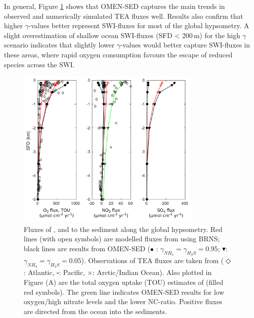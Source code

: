\documentclass[gmd, manuscript]{copernicus}
\begin{document}
In general, Figure \ref{fig:hypsometry} shows that OMEN-SED captures the main trends in observed and numerically simulated TEA fluxes well. Results also confirm that higher $\gamma$-values better represent SWI-fluxes for most of the global hypsometry. 
A slight overestimation of shallow ocean SWI-fluxes (SFD < 200\,m) for the high $\gamma$ scenario indicates that slightly lower $\gamma$-values would better capture SWI-fluxes in these areas, where rapid oxygen consumption favours the 
escape of reduced species across the SWI.

\begin{figure}[tbp]
\begin{center}
	\includegraphics[width=0.8\textwidth]{figures/0_OMEN_Thullner_hypsometry_fluxes_diff_NCratio.pdf}
	\caption{Fluxes of ,  and  to the sediment along the global hypsometry. 
	Red lines (with open symbols) are modelled fluxes from \citet{thullner_global_scale_2009} using BRNS; black lines are results from OMEN-SED ($\bullet$ : $\gamma_{NH_4}=\gamma_{H_2S}=0.95$; 
	$\blacktriangledown$: $\gamma_{NH_4}=\gamma_{H_2S}=0.05$). 
	Observations of TEA fluxes are taken from \citet{middelburg_denitrification_1996} ($\Diamond$: Atlantic, $\square$: Pacific, $\times$: Arctic/Indian Ocean). 
	Also plotted in Figure (A) are the total oxygen uptake (TOU) estimates of \citet{thullner_global_scale_2009} (filled red symbols). The green line indicates OMEN-SED results for low oxygen/high nitrate levels and the lower 
	NC-ratio. Positive fluxes are directed from the ocean into the sediments.
	}\label{fig:hypsometry}
\end{center}
\end{figure}
\end{document}
